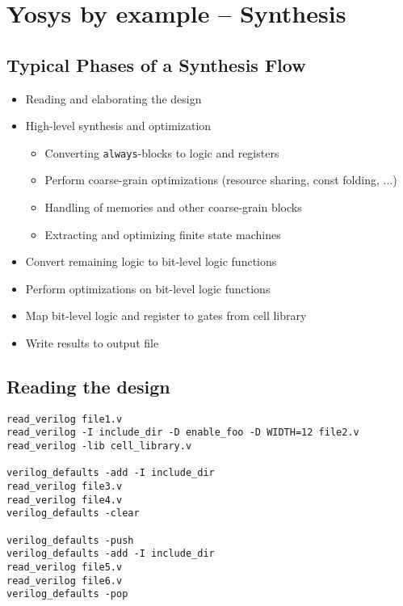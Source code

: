 
\section{Yosys by example -- Synthesis}

\begin{frame}
\sectionpage
\end{frame}


\subsection{Typical Phases of a Synthesis Flow}

\begin{frame}{\subsecname}
\begin{itemize}
\item Reading and elaborating the design
\item High-level synthesis and optimization
\begin{itemize}
\item Converting {\tt always}-blocks to logic and registers
\item Perform coarse-grain optimizations (resource sharing, const folding, ...)
\item Handling of memories and other coarse-grain blocks
\item Extracting and optimizing finite state machines
\end{itemize}
\item Convert remaining logic to bit-level logic functions
\item Perform optimizations on bit-level logic functions
\item Map bit-level logic and register to gates from cell library
\item Write results to output file 
\end{itemize}
\end{frame}


\subsection{Reading the design}

\begin{frame}[fragile]{\subsecname}
\begin{lstlisting}[xleftmargin=0.5cm, basicstyle=\ttfamily\fontsize{8pt}{10pt}\selectfont]
read_verilog file1.v
read_verilog -I include_dir -D enable_foo -D WIDTH=12 file2.v
read_verilog -lib cell_library.v

verilog_defaults -add -I include_dir
read_verilog file3.v
read_verilog file4.v
verilog_defaults -clear

verilog_defaults -push
verilog_defaults -add -I include_dir
read_verilog file5.v
read_verilog file6.v
verilog_defaults -pop
\end{lstlisting}
\end{frame}

